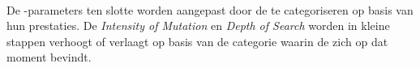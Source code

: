 \paragraph{}
De \abh{}-parameters ten slotte worden aangepast door de \abhn{} te categoriseren op basis van hun prestaties. De \emph{Intensity of Mutation} en \emph{Depth of Search} worden in kleine stappen verhoogt of verlaagt op basis van de categorie waarin de \abh{} zich op dat moment bevindt.